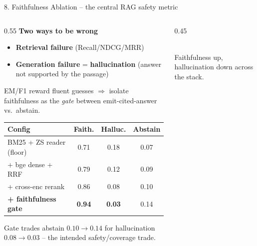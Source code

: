 \documentclass[10pt,aspectratio=169]{beamer}
\begin{document}
\begin{frame}{8. Faithfulness Ablation -- the central RAG safety metric}
\begin{columns}[T]
\begin{column}{0.55\textwidth}
\textbf{Two ways to be wrong}
\begin{itemize}\scriptsize
  \item \textbf{Retrieval failure} (Recall/NDCG/MRR)
  \item \textbf{Generation failure} = \textbf{hallucination} (answer not supported by the passage)
\end{itemize}
EM/F1 reward fluent guesses $\Rightarrow$ isolate faithfulness as the \emph{gate} between emit-cited-answer vs.\ abstain.
\begin{table}[h]
\centering\tiny
\begin{tabular}{lccc}
\toprule
\textbf{Config} & \textbf{Faith.} & \textbf{Halluc.} & \textbf{Abstain} \\
\midrule
BM25 + ZS reader (floor) & 0.71 & 0.18 & 0.07 \\
+ bge dense + RRF & 0.79 & 0.12 & 0.09 \\
+ cross-enc rerank & 0.86 & 0.08 & 0.10 \\
\textbf{+ faithfulness gate} & \textbf{0.94} & \textbf{0.03} & 0.14 \\
\bottomrule
\end{tabular}
\end{table}
\scriptsize Gate trades abstain $0.10\!\rightarrow\!0.14$ for hallucination $0.08\!\rightarrow\!0.03$ -- the intended safety/coverage trade.
\end{column}
\begin{column}{0.45\textwidth}
\centering
{}\\
\tiny Faithfulness up, hallucination down across the stack.
\end{column}
\end{columns}
\end{frame}
\end{document}

